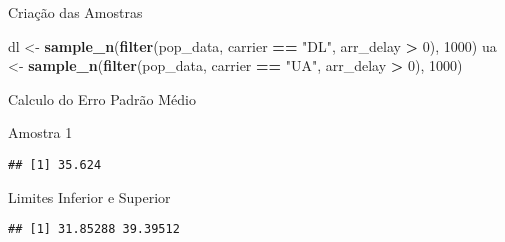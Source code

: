 \documentclass[]{article}
\newenvironment{Shaded}{\begin{snugshade}}{\end{snugshade}}
\newcommand{\DecValTok}[1]{\textcolor[rgb]{0.00,0.00,0.81}{#1}}
\newcommand{\FloatTok}[1]{\textcolor[rgb]{0.00,0.00,0.81}{#1}}
\newcommand{\KeywordTok}[1]{\textcolor[rgb]{0.13,0.29,0.53}{\textbf{#1}}}
\newcommand{\NormalTok}[1]{#1}
\newcommand{\OperatorTok}[1]{\textcolor[rgb]{0.81,0.36,0.00}{\textbf{#1}}}
\newcommand{\StringTok}[1]{\textcolor[rgb]{0.31,0.60,0.02}{#1}}
\begin{document}
 Criação das Amostras

\begin{Shaded}
\begin{Highlighting}[]
\NormalTok{dl <-}\StringTok{ }\KeywordTok{sample_n}\NormalTok{(}\KeywordTok{filter}\NormalTok{(pop_data, carrier }\OperatorTok{==}\StringTok{ "DL"}\NormalTok{, arr_delay }\OperatorTok{>}\StringTok{ }\DecValTok{0}\NormalTok{), }\DecValTok{1000}\NormalTok{)}
\NormalTok{ua <-}\StringTok{ }\KeywordTok{sample_n}\NormalTok{(}\KeywordTok{filter}\NormalTok{(pop_data, carrier }\OperatorTok{==}\StringTok{ "UA"}\NormalTok{, arr_delay }\OperatorTok{>}\StringTok{ }\DecValTok{0}\NormalTok{), }\DecValTok{1000}\NormalTok{)}
\end{Highlighting}
\end{Shaded}

Calculo do Erro Padrão Médio

Amostra 1

\begin{Shaded}
\end{Shaded}

\begin{verbatim}
## [1] 35.624
\end{verbatim}

Limites Inferior e Superior

\begin{Shaded}
\end{Shaded}

\begin{verbatim}
## [1] 31.85288 39.39512
\end{verbatim}
\end{document}
